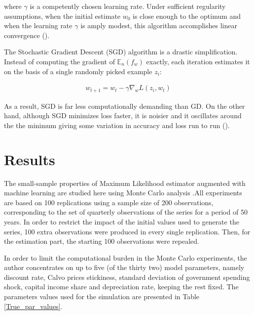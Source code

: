 \documentclass{pracamgr}
\numberwithin{equation}{section}
\begin{document}
where $\gamma$ is a competently chosen learning rate. Under sufficient regularity assumptions, when the initial estimate $w_{0}$ is close enough to the optimum and when the learning rate $\gamma$ is amply modest, this algorithm accomplishes linear convergence (\citet{dennis1996numerical}).

The Stochastic Gradient Descent (SGD) algorithm is a drastic simplification. Instead of computing the gradient of $\mathbb{E}_{n} (f_{w})$ exactly, each iteration estimates it on the basis of a single randomly picked example $z_{i}$:

\begin{align}
w_{t+1} = w_{t} - \gamma \nabla_{w} L(z_{i}, w_{t})
\end{align}

As a result, SGD is far less computationally demanding than GD. On the other hand, although SGD minimizes loss faster, it is noisier and it oscillates around the the minimum giving some variation in accuracy and loss run to run (\citet{bottou2012stochastic}).

\chapter{Results}

The small-sample properties of Maximum Likelihood estimator augmented with machine learning are studied here using Monte Carlo analysis .All experiments are based on 100 replications using a sample size of 200 observations, corresponding to the set of quarterly observations of the series for a period of 50 years. In order to restrict the impact of the initial values used to generate the series, 100 extra observations were produced in every single replication. Then, for the estimation part, the starting 100 observations were repealed.

In order to limit the computational burden in the Monte Carlo experiments, the author concentrates on up to five (of the thirty two) model parameters, namely discount rate, Calvo prices stickiness, standard deviation of government spending shock, capital income share and depreciation rate, keeping the rest fixed. The parameters values used for the simulation are presented in Table \ref{True_par_values}.

\newpage
\end{document}
